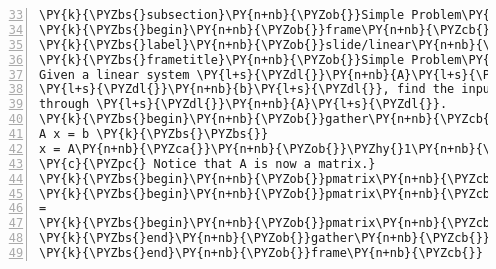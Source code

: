 \begin{Verbatim}[commandchars=\\\{\},numbers=left,numbersep=0.5em,firstnumber=33]
\PY{k}{\PYZbs{}subsection}\PY{n+nb}{\PYZob{}}Simple Problem\PY{n+nb}{\PYZcb{}}
\PY{k}{\PYZbs{}begin}\PY{n+nb}{\PYZob{}}frame\PY{n+nb}{\PYZcb{}}
\PY{k}{\PYZbs{}label}\PY{n+nb}{\PYZob{}}slide/linear\PY{n+nb}{\PYZus{}}system\PY{n+nb}{\PYZcb{}}
\PY{k}{\PYZbs{}frametitle}\PY{n+nb}{\PYZob{}}Simple Problem\PY{n+nb}{\PYZcb{}}
Given a linear system \PY{l+s}{\PYZdl{}}\PY{n+nb}{A}\PY{l+s}{\PYZdl{}} and a resulting output
\PY{l+s}{\PYZdl{}}\PY{n+nb}{b}\PY{l+s}{\PYZdl{}}, find the input \PY{l+s}{\PYZdl{}}\PY{n+nb}{x}\PY{l+s}{\PYZdl{}} which maps to \PY{l+s}{\PYZdl{}}\PY{n+nb}{b}\PY{l+s}{\PYZdl{}}
through \PY{l+s}{\PYZdl{}}\PY{n+nb}{A}\PY{l+s}{\PYZdl{}}.
\PY{k}{\PYZbs{}begin}\PY{n+nb}{\PYZob{}}gather\PY{n+nb}{\PYZcb{}}
A x = b \PY{k}{\PYZbs{}\PYZbs{}}
x = A\PY{n+nb}{\PYZca{}}\PY{n+nb}{\PYZob{}}\PYZhy{}1\PY{n+nb}{\PYZcb{}} b \PY{k}{\PYZbs{}\PYZbs{}}\PY{n+na}{[2em]}
\PY{c}{\PYZpc{} Notice that A is now a matrix.}
\PY{k}{\PYZbs{}begin}\PY{n+nb}{\PYZob{}}pmatrix\PY{n+nb}{\PYZcb{}}\PY{k}{\PYZbs{}input}\PY{n+nb}{\PYZob{}}pieces/A.tex\PY{n+nb}{\PYZcb{}}\PY{k}{\PYZbs{}end}\PY{n+nb}{\PYZob{}}pmatrix\PY{n+nb}{\PYZcb{}}
\PY{k}{\PYZbs{}begin}\PY{n+nb}{\PYZob{}}pmatrix\PY{n+nb}{\PYZcb{}}\PY{k}{\PYZbs{}input}\PY{n+nb}{\PYZob{}}pieces/x.tex\PY{n+nb}{\PYZcb{}}\PY{k}{\PYZbs{}end}\PY{n+nb}{\PYZob{}}pmatrix\PY{n+nb}{\PYZcb{}}
= 
\PY{k}{\PYZbs{}begin}\PY{n+nb}{\PYZob{}}pmatrix\PY{n+nb}{\PYZcb{}}\PY{k}{\PYZbs{}input}\PY{n+nb}{\PYZob{}}pieces/b.tex\PY{n+nb}{\PYZcb{}}\PY{k}{\PYZbs{}end}\PY{n+nb}{\PYZob{}}pmatrix\PY{n+nb}{\PYZcb{}}
\PY{k}{\PYZbs{}end}\PY{n+nb}{\PYZob{}}gather\PY{n+nb}{\PYZcb{}}
\PY{k}{\PYZbs{}end}\PY{n+nb}{\PYZob{}}frame\PY{n+nb}{\PYZcb{}}
\end{Verbatim}
